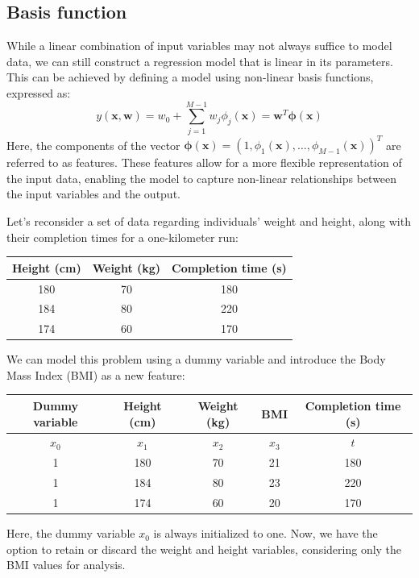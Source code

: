 \subsection{Basis function}
While a linear combination of input variables may not always suffice to model data, we can still construct a regression model that is linear in its parameters. 
This can be achieved by defining a model using non-linear basis functions, expressed as:
\[y(\textbf{x},\textbf{w})=w_0+\sum_{j=1}^{M-1}w_j \phi_j(\textbf{x})=\textbf{w}^T\boldsymbol{\phi}(\textbf{x})\]
Here, the components of the vector  $\boldsymbol{\phi}(\textbf{x})={\left( 1,\phi_1(\textbf{x}),\ldots,\phi_{M-1}(\textbf{x}) \right)}^T$  are referred to as features.
These features allow for a more flexible representation of the input data, enabling the model to capture non-linear relationships between the input variables and the output.
\begin{example}
    Let's reconsider a set of data regarding individuals' weight and height, along with their completion times for a one-kilometer run:
    \begin{table}[H]
        \centering
        \begin{tabular}{c|c|c}
        \textbf{Height (cm)} & \textbf{Weight (kg)} & \textbf{Completion time (s)} \\ \hline
        180                  & 70                   & 180                          \\
        184                  & 80                   & 220                          \\
        174                  & 60                   & 170                         
        \end{tabular}
    \end{table}
    We can model this problem using a dummy variable and introduce the Body Mass Index (BMI) as a new feature:
    \begin{table}[H]
        \centering
        \begin{tabular}{c|c|c|c|c}
        \textbf{Dummy variable} & \textbf{Height (cm)} & \textbf{Weight (kg)} & \textbf{BMI} & \textbf{Completion time (s)} \\ \hline
        $x_0$                   & $x_1$                & $x_2$                & $x_3$        & $t$                          \\
        1                       & 180                  & 70                   & 21           & 180                          \\
        1                       & 184                  & 80                   & 23           & 220                          \\
        1                       & 174                  & 60                   & 20           & 170                         
        \end{tabular}
    \end{table}
    Here, the dummy variable $x_0$ is always initialized to one.
    Now, we have the option to retain or discard the weight and height variables, considering only the BMI values for analysis.
\end{example}
